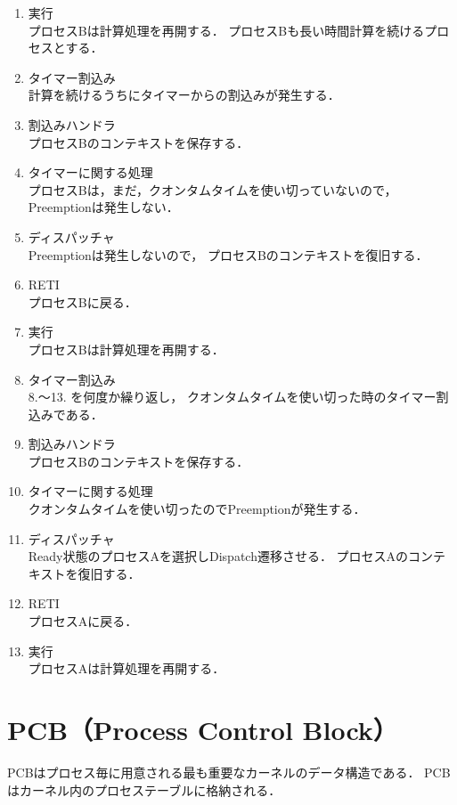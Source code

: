 \begin{enumerate}
\item 実行 \\
プロセスBは計算処理を再開する．
プロセスBも長い時間計算を続けるプロセスとする．

\item タイマー割込み \\
計算を続けるうちにタイマーからの割込みが発生する．

\item 割込みハンドラ \\
プロセスBのコンテキストを保存する．

\item タイマーに関する処理 \\
プロセスBは，まだ，クオンタムタイムを使い切っていないので，
Preemptionは発生しない．

\item ディスパッチャ \\
Preemptionは発生しないので，
プロセスBのコンテキストを復旧する．

\item RETI \\
プロセスBに戻る．

\item 実行 \\
プロセスBは計算処理を再開する．

\item タイマー割込み \\
8.〜13. を何度か繰り返し，
クオンタムタイムを使い切った時のタイマー割込みである．

\item 割込みハンドラ \\
プロセスBのコンテキストを保存する．

\item タイマーに関する処理 \\
クオンタムタイムを使い切ったのでPreemptionが発生する．

\item ディスパッチャ \\
Ready状態のプロセスAを選択しDispatch遷移させる．
プロセスAのコンテキストを復旧する．

\item RETI \\
プロセスAに戻る．

\item 実行 \\
プロセスAは計算処理を再開する．
\end{enumerate}

\section{PCB（Process Control Block）}
PCBはプロセス毎に用意される最も重要なカーネルのデータ構造である．
PCBはカーネル内のプロセステーブルに格納される．

